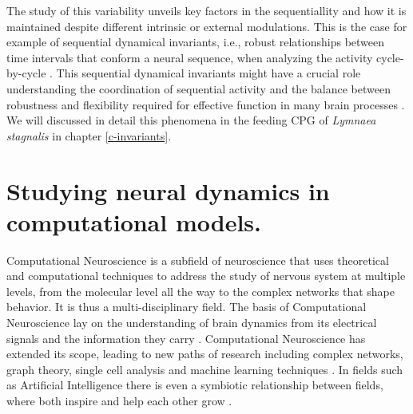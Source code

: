 The study of this variability unveils key factors in the sequentiallity and how it is maintained despite different intrinsic or external modulations. This is the case for example of sequential dynamical invariants, i.e., robust relationships between time intervals that conform a neural sequence, when analyzing the activity cycle-by-cycle \parencite{reyes_artificial_2008,elices_robust_2019,garrido-pena_characterization_2021,berbel_emergence_2024}. This sequential dynamical invariants might have a crucial role understanding the coordination of sequential activity and the balance between robustness and flexibility required for effective function in many brain processes \parencite{citas}. We will discussed in detail this phenomena in the feeding CPG of \textit{Lymnaea stagnalis} in chapter \ref{c-invariants}.


\section{Studying neural dynamics in computational models.}
\label{sec:computational neuroscience}
Computational Neuroscience is a subfield of neuroscience that uses theoretical and computational techniques to address the study of nervous system at multiple levels, from the molecular level all the way to the complex networks that shape behavior. It is thus a multi-disciplinary field. The basis of Computational Neuroscience lay on the understanding of brain dynamics from its electrical signals and the information they carry \parencite{schwiening_brief_2012,catterall_hodgkin-huxley_2012,dimitrov_information_2011,shannon_mathematical_1948}. Computational Neuroscience has extended its scope, leading to new paths of research including complex networks, graph theory, single cell analysis and machine learning techniques \parencite{cns2023}. In fields such as Artificial Intelligence there is even a symbiotic relationship between fields, where both inspire and help each other grow \parencite{amunts_human_2019,wozniak_deep_2020,goncalves_training_2020}.

